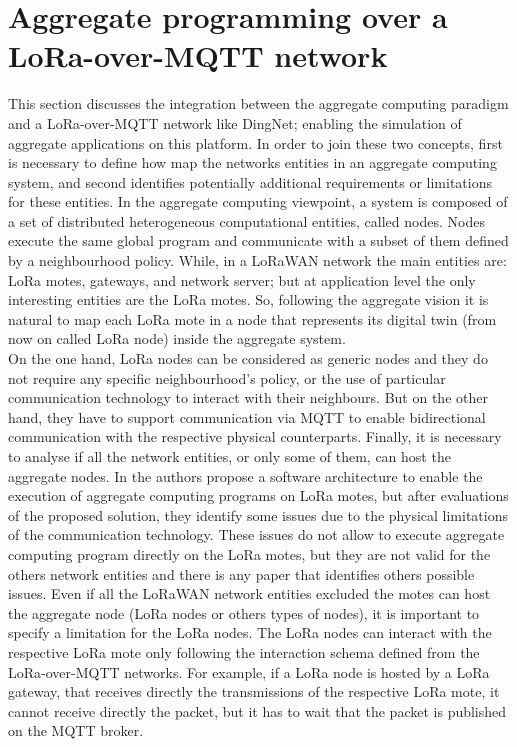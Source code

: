 \section{Aggregate programming over a LoRa-over-MQTT network}
\label{sec:contributionACOverDingNet}
This section discusses the integration between the aggregate computing paradigm and a LoRa-over-MQTT network like DingNet; enabling the simulation of aggregate applications on this platform.
In order to join these two concepts, first is necessary to define how map the networks entities in an aggregate computing system, and second identifies potentially additional requirements or limitations for these entities.
In the aggregate computing viewpoint, a system is composed of a set of distributed heterogeneous computational entities, called nodes. Nodes execute the same global program and communicate with a subset of them defined by a neighbourhood policy. 
While, in a LoRaWAN network the main entities are: LoRa motes, gateways, and network server; but at application level the only interesting entities are the LoRa motes.
So, following the aggregate vision it is natural to map each LoRa mote in a node that represents its digital twin (from now on called LoRa node) inside the aggregate system.
\\On the one hand, LoRa nodes can be considered as generic nodes and they do not require any specific neighbourhood's policy, or the use of particular communication technology to interact with their neighbours. 
But on the other hand, they have to support communication via MQTT to enable bidirectional communication with the respective physical counterparts.
Finally, it is necessary to analyse if all the network entities, or only some of them, can host the aggregate nodes.
In \cite{CCNCPS2018} the authors propose a software architecture to enable the execution of aggregate computing programs on LoRa motes, but after evaluations of the proposed solution, they identify some issues due to the physical limitations of the communication technology. 
These issues do not allow to execute aggregate computing program directly on the LoRa motes, but they are not valid for the others network entities and there is any paper that identifies others possible issues.
Even if all the LoRaWAN network entities excluded the motes can host the aggregate node (LoRa nodes or others types of nodes), it is important to specify a limitation for the LoRa nodes. 
The LoRa nodes can interact with the respective LoRa mote only following the interaction schema defined from the LoRa-over-MQTT networks. 
For example, if a LoRa node is hosted by a LoRa gateway, that receives directly the transmissions of the respective LoRa mote, it cannot receive directly the packet, but it has to wait that the packet is published on the MQTT broker.


